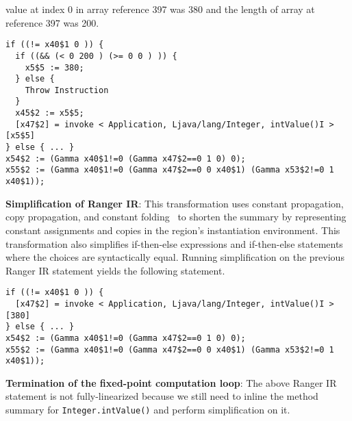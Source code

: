 value at index 0 in array reference 397 was 380 and the length of array at reference 397 was 200.\\
\begin{lstlisting}[numbers=none]
if ((!= x40$1 0 )) {
  if ((&& (< 0 200 ) (>= 0 0 ) )) {
    x5$5 := 380;
  } else {
    Throw Instruction
  }
  x45$2 := x5$5;
  [x47$2] = invoke < Application, Ljava/lang/Integer, intValue()I >[x5$5]
} else { ... }
x54$2 := (Gamma x40$1!=0 (Gamma x47$2==0 1 0) 0);
x55$2 := (Gamma x40$1!=0 (Gamma x47$2==0 0 x40$1) (Gamma x53$2!=0 1 x40$1));
\end{lstlisting}
%
\textbf{Simplification of Ranger IR}: This transformation uses constant propagation, copy propagation, and constant
folding~\cite{dragon-book} to shorten the summary by representing constant assignments and copies
in the region\rq s instantiation environment.
%
This transformation also simplifies if-then-else expressions and if-then-else statements where the choices are
syntactically equal.
%
Running simplification on the previous Ranger IR statement yields the following statement.
\begin{lstlisting}[numbers=none]
if ((!= x40$1 0 )) {
  [x47$2] = invoke < Application, Ljava/lang/Integer, intValue()I >[380]
} else { ... }
x54$2 := (Gamma x40$1!=0 (Gamma x47$2==0 1 0) 0);
x55$2 := (Gamma x40$1!=0 (Gamma x47$2==0 0 x40$1) (Gamma x53$2!=0 1 x40$1));
\end{lstlisting}
%
\textbf{Termination of the fixed-point computation loop}: The above Ranger IR statement is not fully-linearized
because we still need to inline the method summary for {\tt Integer.intValue()} and perform simplification on it.

